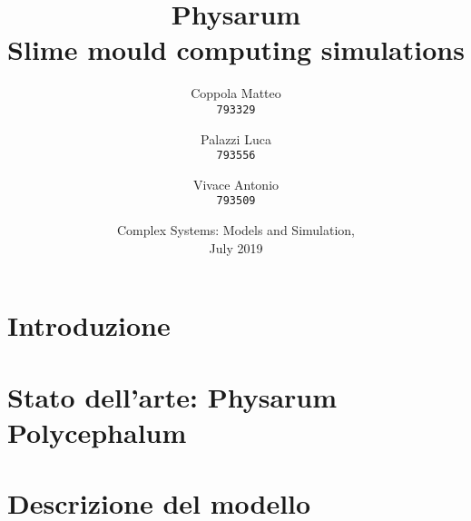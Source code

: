 \documentclass{report}
\begin{document}
\title{%
  \Huge Physarum\\
  \large Slime mould computing simulations\\
    }
\author{
  Coppola Matteo\\
  \texttt{793329}
  \and
  Palazzi Luca\\
  \texttt{793556}
   \and
  Vivace Antonio\\
  \texttt{793509}
}
\date{Complex Systems: Models and Simulation, \\ July 2019}
\maketitle

\tableofcontents

\chapter{Introduzione}


\chapter{Stato dell'arte: Physarum Polycephalum}

\chapter{Descrizione del modello}
\end{document}
